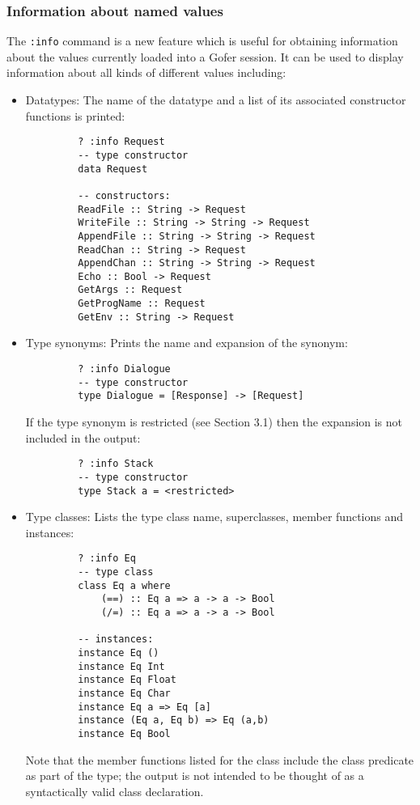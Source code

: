 \subsubsection{Information about named values}
The \verb":info" command is a new feature which is useful for obtaining
information about the values currently loaded into a Gofer session.  It
can be used to display information about all kinds of different values
including:
\begin{itemize}
\item  Datatypes:  The name of the datatype and a list of its associated
     constructor functions is printed:
\begin{verbatim}
         ? :info Request
         -- type constructor
         data Request

         -- constructors:
         ReadFile :: String -> Request
         WriteFile :: String -> String -> Request
         AppendFile :: String -> String -> Request
         ReadChan :: String -> Request
         AppendChan :: String -> String -> Request
         Echo :: Bool -> Request
         GetArgs :: Request
         GetProgName :: Request
         GetEnv :: String -> Request
\end{verbatim}
\item  Type synonyms:  Prints the name and expansion of the synonym:
\begin{verbatim}
         ? :info Dialogue
         -- type constructor
         type Dialogue = [Response] -> [Request]
\end{verbatim}
     If the type synonym is restricted (see Section 3.1) then the
     expansion is not included in the output:
\begin{verbatim}
         ? :info Stack      
         -- type constructor
         type Stack a = <restricted>
\end{verbatim}
\item  Type classes: Lists the type class name, superclasses, member
     functions and instances:
\begin{verbatim}
         ? :info Eq
         -- type class
         class Eq a where
             (==) :: Eq a => a -> a -> Bool
             (/=) :: Eq a => a -> a -> Bool

         -- instances:
         instance Eq ()
         instance Eq Int
         instance Eq Float
         instance Eq Char
         instance Eq a => Eq [a]
         instance (Eq a, Eq b) => Eq (a,b)
         instance Eq Bool
\end{verbatim}
     Note that the member functions listed for the class include the
     class predicate as part of the type; the output is not intended
     to be thought of as a syntactically valid class declaration.


\end{itemize}
